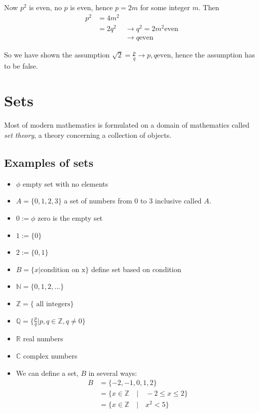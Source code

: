 Now $p^2$ is even, no $p$ is even, hence $p = 2m$ for some integer $m$. Then
\begin{align}
  p^2 &= 4m^2 & \\
      &= 2q^2 & \to q^2 = 2m^2 \text{even} \\
      &       & \to q \text{even}
\end{align}

So we have shown the assumption $\sqrt{2} = \frac{p}{q} \to p,q \text{even}$,
hence the assumption has to be false.


\section{Sets}
Most of modern mathematics is formulated on a domain of mathematics called
\emph{set theory}, a theory concerning a collection of objects.

\subsection{Examples of sets}
\begin{itemize}
  \item $\phi$ empty set with no elements
  \item $A = \{ 0, 1, 2, 3 \}$ a set of numbers from 0 to 3 inclusive called $A$.
  \item $0 := \phi$ zero is the empty set
  \item $1 := \{ 0 \}$
  \item $2 := \{ 0, 1 \}$
  \item $B = \{ x | \text{condition on x} \}$ define set based on condition
  \item $\mathbb{N} = \{ 0, 1, 2, ... \} $
  \item $\mathbb{Z} = \{ \text{ all integers} \}$
  \item $\mathbb{Q} = \{ \frac{p}{q} | p,q \in \mathbb{Z}, q \neq 0 \}$
  \item $\mathbb{R}$ real numbers
  \item $\mathbb{C}$ complex numbers
  \item We can define a set, $B$ in several ways:
  \begin{align}
    B &= \{ -2, -1, 0, 1, 2 \} \\
      &= \{ x \in \mathbb{Z} \quad | \quad -2 \leq x \leq 2 \} \\
      &= \{ x \in \mathbb{Z} \quad | \quad x^2 < 5 \}
  \end{align}
\end{itemize}

